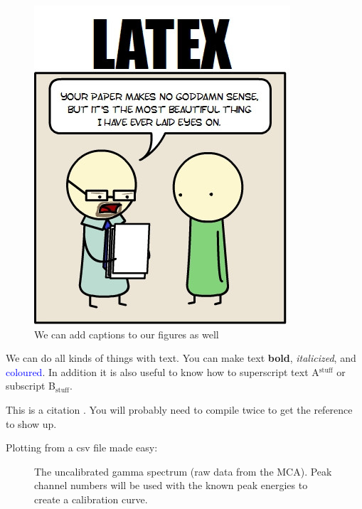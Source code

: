 \documentclass[a4paper]{article}
\begin{document}
\begin{figure}[h]
\begin{center}
\includegraphics[scale=0.5]{figure_example}
\end{center}
\caption{We can add captions to our figures as well}
\end{figure}

\newpage


We can do all kinds of things with text. You can make text \textbf{bold}, 
\emph{italicized}, and \textcolor{blue}{coloured}. In addition it is also 
useful to know how to superscript text A${}^{\text{stuff}}$ or subscript 
B${}_{\text{stuff}}$. 

\newpage

This is a citation \cite{greenwade93}. You will probably need to compile twice to get the reference to show up. 




\newpage

Plotting from a csv file made easy:

\begin{figure}[hb]
\centering
{}
\caption{The uncalibrated gamma spectrum (raw data from the MCA). Peak channel numbers will be used with the known peak energies to create a calibration curve.}
\end{figure}
\end{document}
